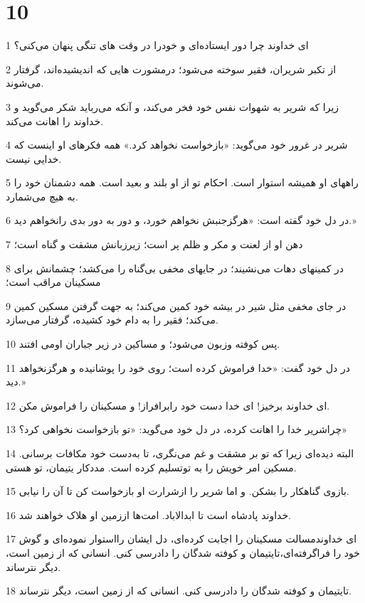 \chapter{10}

\par 1 ای خداوند چرا دور ایستاده‌ای و خودرا در وقت های تنگی پنهان می‌کنی؟
\par 2 از تکبر شریران، فقیر سوخته می‌شود؛ درمشورت هایی که اندیشیده‌اند، گرفتار می‌شوند.
\par 3 زیرا که شریر به شهوات نفس خود فخر می‌کند، و آنکه می‌رباید شکر می‌گوید و خداوند را اهانت می‌کند.
\par 4 شریر در غرور خود می‌گوید: «بازخواست نخواهد کرد.» همه فکرهای او اینست که خدایی نیست.
\par 5 راههای او همیشه استوار است. احکام تو از او بلند و بعید است. همه دشمنان خود را به هیچ می‌شمارد. 
\par 6 در دل خود گفته است: «هرگزجنبش نخواهم خورد، و دور به دور بدی رانخواهم دید.»
\par 7 دهن او از لعنت و مکر و ظلم پر است؛ زیرزبانش مشقت و گناه است؛
\par 8 در کمینهای دهات می‌نشیند؛ در جایهای مخفی بی‌گناه را می‌کشد؛ چشمانش برای مسکینان مراقب است؛
\par 9 در جای مخفی مثل شیر در بیشه خود کمین می‌کند؛ به جهت گرفتن مسکین کمین می‌کند؛ فقیر را به دام خود کشیده، گرفتار می‌سازد.
\par 10 پس کوفته وزبون می‌شود؛ و مساکین در زیر جباران اومی افتند.
\par 11 در دل خود گفت: «خدا فراموش کرده است؛ روی خود را پوشانیده و هرگزنخواهد دید.»
\par 12 ‌ای خداوند برخیز! ای خدا دست خود رابرافراز! و مسکینان را فراموش مکن.
\par 13 چراشریر خدا را اهانت کرده، در دل خود می‌گوید: «تو بازخواست نخواهی کرد؟»
\par 14 البته دیده‌ای زیرا که تو بر مشقت و غم می‌نگری، تا به‌دست خود مکافات برسانی. مسکین امر خویش را به توتسلیم کرده است. مددکار یتیمان، تو هستی.
\par 15 بازوی گناهکار را بشکن. و اما شریر را ازشرارت او بازخواست کن تا آن را نیابی.
\par 16 خداوند پادشاه است تا ابدالاباد. امت‌ها اززمین او هلاک خواهند شد.
\par 17 ‌ای خداوندمسالت مسکینان را اجابت کرده‌ای، دل ایشان رااستوار نموده‌ای و گوش خود را فراگرفته‌ای،تایتیمان و کوفته شدگان را دادرسی کنی. انسانی که از زمین است، دیگر نترساند.
\par 18 تایتیمان و کوفته شدگان را دادرسی کنی. انسانی که از زمین است، دیگر نترساند.
 
